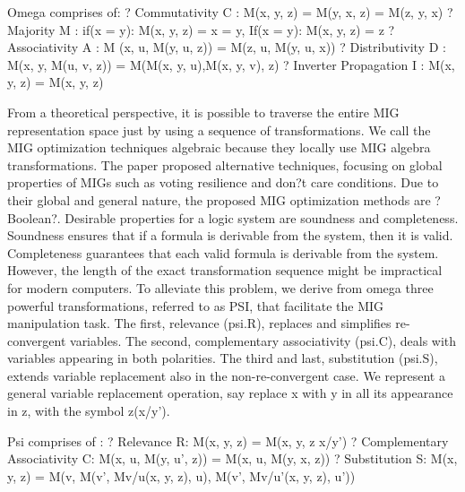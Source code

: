 \documentclass[
	accentcolor=1c,%
	type=intern,
	marginpar=false,
	ruledheaders=section,
	class=report,
	BCOR=5mm,
      parskip=half-,
	fontsize=10pt
	]{tudapub}
\begin{document}
	Omega comprises of:\newline
	?	Commutativity C : M(x, y, z) = M(y, x, z) = M(z, y, x)\newline
	?	Majority M :  if(x = y): M(x, y, z) = x = y, If(x = y): M(x, y, z) = z\newline
	?	Associativity A : M (x, u, M(y, u, z)) = M(z, u, M(y, u, x))\newline
	?	Distributivity D : M(x, y, M(u, v, z)) = M(M(x, y, u),M(x, y, v), z)\newline
	?	Inverter Propagation I : M(x, y, z) = M(x, y, z)\newline
	\newline

	From a theoretical perspective, it is possible to traverse the entire MIG representation space just by using a sequence of transformations. We call the MIG optimization techniques algebraic because they locally use MIG algebra transformations. The paper proposed alternative techniques, focusing on global properties of MIGs such as voting resilience and don?t care conditions. Due to their global and general nature, the proposed MIG optimization methods are ?Boolean?. Desirable properties for a logic system are soundness and completeness. Soundness ensures that if a formula is derivable from the system, then it is valid. Completeness guarantees that each valid formula is derivable from the system. However, the length of the exact transformation sequence might be impractical for modern computers.\newline
	\newline
	To alleviate this problem, we derive from omega three powerful transformations, referred to as PSI, that facilitate the MIG manipulation task. The first, relevance (psi.R), replaces and simplifies re-convergent variables. The second, complementary associativity (psi.C), deals with variables appearing in both polarities. The third and last, substitution (psi.S), extends variable replacement also in the non-re-convergent case. We represent a general variable replacement operation, say replace x with y in all its appearance in z, with the symbol z(x/y').

	Psi comprises of :\newline
	?	Relevance R: M(x, y, z) = M(x, y, z x/y')\newline
	?	Complementary Associativity C: M(x, u, M(y, u', z)) = M(x, u, M(y, x, z))\newline
	?	Substitution S: M(x, y, z) = M(v, M(v', Mv/u(x, y, z), u), M(v', Mv/u'(x, y, z), u'))\newline
\end{document}
